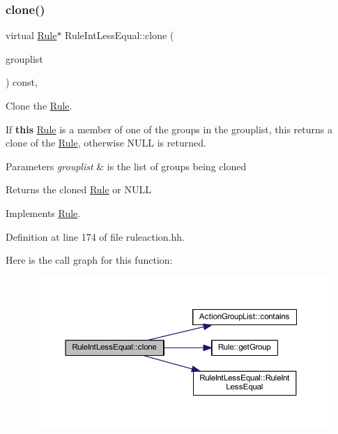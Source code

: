 \subsubsection{\texorpdfstring{clone()}{clone()}}
{\footnotesize\ttfamily virtual \mbox{\hyperlink{class_rule}{Rule}}$\ast$ Rule\+Int\+Less\+Equal\+::clone (\begin{DoxyParamCaption}\item[{const \mbox{\hyperlink{class_action_group_list}{Action\+Group\+List}} \&}]{grouplist }\end{DoxyParamCaption}) const\hspace{0.3cm}{\ttfamily [inline]}, {\ttfamily [virtual]}}



Clone the \mbox{\hyperlink{class_rule}{Rule}}. 

If {\bfseries{this}} \mbox{\hyperlink{class_rule}{Rule}} is a member of one of the groups in the grouplist, this returns a clone of the \mbox{\hyperlink{class_rule}{Rule}}, otherwise N\+U\+LL is returned. 
\begin{DoxyParams}{Parameters}
{\em grouplist} & is the list of groups being cloned \\
\hline
\end{DoxyParams}
\begin{DoxyReturn}{Returns}
the cloned \mbox{\hyperlink{class_rule}{Rule}} or N\+U\+LL 
\end{DoxyReturn}


Implements \mbox{\hyperlink{class_rule_a70de90a76461bfa7ea0b575ce3c11e4d}{Rule}}.



Definition at line 174 of file ruleaction.\+hh.

Here is the call graph for this function\+:
\nopagebreak
\begin{figure}[H]
\begin{center}
\leavevmode
\includegraphics[width=350pt]{class_rule_int_less_equal_a81819aa711a35d88d8f0f7d9e5aad3e3_cgraph}
\end{center}
\end{figure}
\mbox{\label{class_rule_int_less_equal_a1926c44b4c14298c375989f03264a4ee}} 

